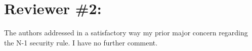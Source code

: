\documentclass[a4paper,11pt]{article}
\begin{document}
\section{Reviewer \#2:}
The authors addressed in a satisfactory way my prior major concern regarding the N-1 security rule. I have no further comment.




\end{document}
